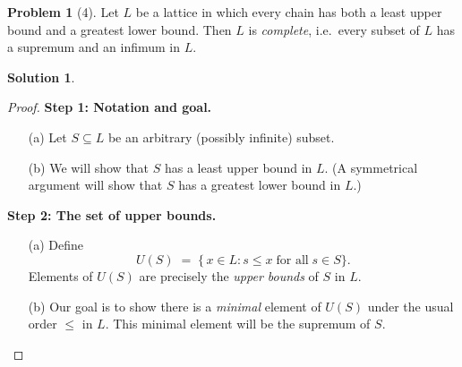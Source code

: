 \documentclass[12pt]{article}
\theoremstyle{definition} %
\newtheorem{solution}{Solution}
\newtheorem{problem}{Problem}
\theoremstyle{plain} %
\begin{document}
    \begin{problem}[4]
        Let $L$ be a lattice in which every chain has both a least upper bound and a greatest lower bound. Then $L$ is \emph{complete}, i.e.\ every subset of $L$ has a supremum and an infimum in $L$.
    \end{problem}
    \begin{solution}

            \begin{proof}
            \textbf{Step 1: Notation and goal.}
            \begin{enumerate}
                \item[(a)] Let $S \subseteq L$ be an arbitrary (possibly infinite) subset.
                \item[(b)] We will show that $S$ has a least upper bound in $L$. (A symmetrical argument will show that $S$ has a greatest lower bound in $L$.)
            \end{enumerate}
            
            \vspace{0.3cm}
            \textbf{Step 2: The set of upper bounds.}
            \begin{enumerate}
                \item[(a)] Define
                \[
                    U(S) \;=\; \{\, x \in L : s \le x \;\text{for all}\; s \in S \}.
                \]
                Elements of $U(S)$ are precisely the \emph{upper bounds} of $S$ in $L$.
                \item[(b)] Our goal is to show there is a \emph{minimal} element of $U(S)$ under the usual order $\le$ in $L$. This minimal element will be the supremum of $S$.
            \end{enumerate}
            

\end{proof}
\end{solution}
\end{document}
